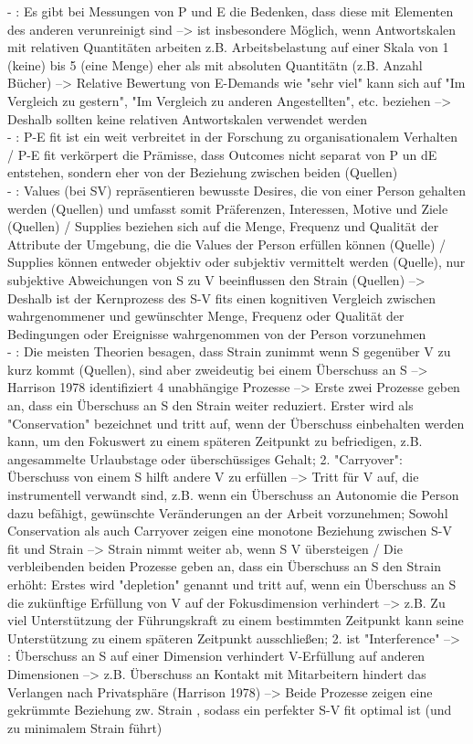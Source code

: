 - \cite[S. 14]{caplan:1987}: Es gibt bei Messungen von P und E die Bedenken, dass diese mit Elementen des anderen verunreinigt sind --> ist insbesondere Möglich, wenn Antwortskalen mit relativen Quantitäten arbeiten z.B. Arbeitsbelastung auf einer Skala von 1 (keine) bis 5 (eine Menge) eher als mit absoluten Quantitätn (z.B.  Anzahl Bücher) --> Relative Bewertung von E-Demands wie "sehr viel" kann sich auf "Im Vergleich zu gestern", "Im Vergleich zu anderen Angestellten", etc. beziehen --> Deshalb sollten keine relativen Antwortskalen verwendet werden  \\
- \cite[S. 1]{edwards:1996}: P-E fit ist ein weit verbreitet in der Forschung zu organisationalem Verhalten / P-E fit verkörpert die Prämisse, dass Outcomes nicht separat von P un dE entstehen, sondern eher von der Beziehung zwischen beiden (Quellen)\\
- \cite[S. 3]{edwards:1996}: Values (bei SV) repräsentieren bewusste Desires, die von einer Person gehalten werden (Quellen) und umfasst somit Präferenzen, Interessen, Motive und Ziele (Quellen) / Supplies beziehen sich auf die Menge, Frequenz und Qualität der Attribute der Umgebung, die die Values der Person erfüllen können (Quelle) / Supplies können entweder objektiv oder subjektiv vermittelt werden (Quelle), nur subjektive Abweichungen von S zu V beeinflussen den Strain (Quellen) --> Deshalb ist der Kernprozess des S-V fits einen kognitiven Vergleich zwischen wahrgenommener und gewünschter Menge, Frequenz oder Qualität der Bedingungen oder Ereignisse wahrgenommen von der Person vorzunehmen \\
- \cite[S. 3]{edwards:1996}: Die meisten Theorien besagen, dass Strain zunimmt wenn S gegenüber V zu kurz kommt (Quellen), sind aber zweideutig bei einem Überschuss an S --> Harrison 1978 identifiziert 4 unabhängige Prozesse --> Erste zwei Prozesse geben an, dass ein Überschuss an S den Strain weiter reduziert. Erster wird als "Conservation" bezeichnet und tritt auf, wenn der Überschuss einbehalten werden kann, um den Fokuswert zu einem späteren Zeitpunkt zu befriedigen, z.B. angesammelte Urlaubstage oder überschüssiges Gehalt; 2. "Carryover": Überschuss von einem S hilft andere V zu erfüllen --> Tritt für V auf, die instrumentell verwandt sind, z.B. wenn ein Überschuss an Autonomie die Person dazu befähigt, gewünschte Veränderungen an der Arbeit vorzunehmen; Sowohl Conservation als auch Carryover zeigen eine monotone Beziehung zwischen S-V fit und Strain --> Strain nimmt weiter ab, wenn S V übersteigen / Die verbleibenden beiden Prozesse geben an, dass ein Überschuss an S den Strain erhöht: Erstes wird "depletion" genannt und tritt auf, wenn ein Überschuss an S die zukünftige Erfüllung von V auf der Fokusdimension verhindert --> z.B. Zu viel Unterstützung der Führungskraft zu einem bestimmten Zeitpunkt kann seine Unterstützung zu einem späteren Zeitpunkt ausschließen; 2. ist "Interference" --> \cite[S. 4]{edwards:1996}: Überschuss an S auf einer Dimension verhindert V-Erfüllung auf anderen Dimensionen --> z.B. Überschuss an Kontakt mit Mitarbeitern hindert das Verlangen nach Privatsphäre (Harrison 1978) --> Beide Prozesse zeigen eine gekrümmte Beziehung zw. Strain , sodass ein perfekter S-V fit optimal ist (und zu minimalem Strain führt) \\
